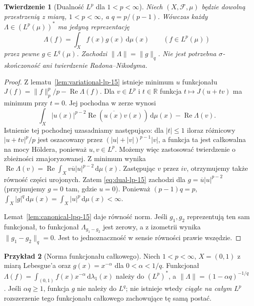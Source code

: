\documentclass[11pt,a4paper,oneside]{book}
\numberwithin{equation}{chapter}
\theoremstyle{plain}
\newtheorem{twierdzenie}{Twierdzenie}[chapter]
\theoremstyle{definition}
\newtheorem{przyklad}[twierdzenie]{Przykład}
\theoremstyle{remark}
\begin{document}
\begin{twierdzenie}[Dualność $L^p$ dla $1<p<\infty$]
\label{thm:dual-lp-15}
Niech $(X,\mathcal F,\mu)$ będzie \emph{dowolną} przestrzenią
z miarą, $1<p<\infty$, a $q=p/(p-1)$.
Wówczas każdy $\Lambda\in (L^p(\mu))^*$ ma \emph{jedyną}
reprezentację
\begin{equation}\label{eq:dual-lp-15}
\Lambda(f)=\int_X f(x)g(x)\,\mathrm d\mu(x)
\qquad(f\in L^p(\mu))
\end{equation}
przez pewne $g\in L^q(\mu)$. Zachodzi
$\|\Lambda\|=\|g\|_q$. Nie jest potrzebna
$\sigma$-skończoność ani twierdzenie Radona--Nikodyma.
\end{twierdzenie}
\begin{proof}
Z lematu~\ref{lem:variational-lp-15} istnieje minimum $u$
funkcjonału $J(f)=\|f\|_p^p/p-\operatorname{Re}\Lambda(f)$.
Dla $v\in L^p$ i $t\in\mathbb R$ funkcja $t\mapsto J(u+tv)$
ma minimum przy $t=0$. Jej pochodna w zerze wynosi
\[
\int_X |u(x)|^{p-2}\operatorname{Re}(\overline{u(x)}v(x))
\,\mathrm d\mu(x)-\operatorname{Re}\Lambda(v).
\]
Istnienie tej pochodnej uzasadniamy następująco:
dla $|t|\le1$ iloraz różnicowy $|u+tv|^p/p$ jest
oszacowany przez $(|u|+|v|)^{p-1}|v|$,
a funkcja ta jest całkowalna na mocy Höldera,
ponieważ $u,v\in L^p$. Możemy więc zastosować
twierdzenie o zbieżności zmajoryzowanej. Z minimum
wynika $\operatorname{Re}\Lambda(v)=
\operatorname{Re}\int_Xv\overline u|u|^{p-2}\,\mathrm d\mu(x)$.
Zastępując $v$ przez $iv$, otrzymujemy także
równość części urojonych. Zatem \eqref{eq:dual-lp-15}
zachodzi dla $g=\overline u|u|^{p-2}$ (przyjmujemy $g=0$
tam, gdzie $u=0$). Ponieważ $(p-1)q=p$,
$\int_X|g|^q\,\mathrm d\mu(x)=\int_X|u|^p\,\mathrm d\mu(x)<\infty$.

Lemat~\ref{lem:canonical-lpq-15} daje równość norm.
Jeśli $g_1,g_2$ reprezentują ten sam funkcjonał,
to funkcjonał $\Lambda_{g_1-g_2}$ jest zerowy,
a z izometrii wynika $\|g_1-g_2\|_q=0$.
Jest to jednoznaczność w sensie równości prawie wszędzie.
\end{proof}

\begin{przyklad}[Norma funkcjonału całkowego]
Niech $1<p<\infty$, $X=(0,1)$ z miarą Lebesgue'a
oraz $g(x)=x^{-\alpha}$ dla $0<\alpha<1/q$.
Funkcjonał $\Lambda(f)=\int_{(0,1)}f(x)x^{-\alpha}
\,\mathrm d\lambda_1(x)$ należy do $(L^p)^*$, a
$\|\Lambda\|=(1-\alpha q)^{-1/q}$.
Jeśli $\alpha q\ge1$, funkcja $g$ nie należy do $L^q$;
nie istnieje wtedy \emph{ciągłe na całym $L^p$} rozszerzenie
tego funkcjonału całkowego zachowujące tę samą postać.
\end{przyklad}
\end{document}
